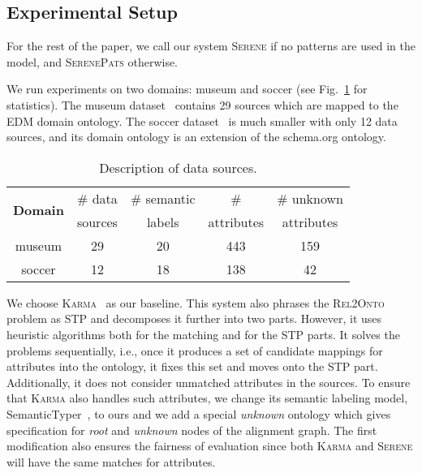 \documentclass[letterpaper]{article} %
\newcommand{\relonto}{\textsc{Rel2Onto}}
\newcommand{\karma}{\textsc{Karma}}
\newcommand{\serene}{\textsc{Serene}}
\newcommand{\serenepats}{\textsc{SerenePats}}
\begin{document}
\subsection{Experimental Setup}

For the rest of the paper, we call our system \serene{} if no patterns are used in the model, and \serenepats{} otherwise.

We run experiments on two domains: museum and soccer (see Fig.~\ref{tab:data} for statistics).
The museum dataset~\cite{taheriyan2016learning} contains 29 sources which are mapped to the EDM domain ontology.
The soccer dataset~\cite{Pham:semantic} is much smaller with only 12 data sources, and its domain ontology is an extension of the schema.org ontology.

\begin{table}[ht]\small
  \centering
  \caption{Description of data sources.}\label{tab:data}
		\begin{tabular}{ccccc}
		\hline
		\multirow{2}{*}{\textbf{Domain}} & \# data & \# semantic & \# & \# unknown\\
		 & sources & labels & attributes & attributes\\
		\hline
		museum & 29 & 20 & 443 & 159  \\
		soccer & 12 & 18 & 138 & 42 \\
		\hline
		\end{tabular} 
\end{table}


We choose \karma{}~\cite{taheriyan2016learning} as our baseline.
This system also phrases the \relonto{} problem as STP and decomposes it further into two parts.
However, it uses heuristic algorithms both for the matching and for the STP 
parts.
It solves the problems sequentially, i.e., once it produces a set of candidate 
mappings for attributes into the ontology, it fixes this set and moves
onto the STP part.
Additionally, it does not consider unmatched attributes in the sources.
To ensure that \karma{} also handles such attributes, we change its semantic 
labeling model, SemanticTyper~\cite{Ramnandan:Assigning}, to ours and we add a 
special \emph{unknown} ontology which gives specification for \emph{root} and 
\emph{unknown} nodes of the alignment graph.
The first modification also ensures the fairness of evaluation since both 
\karma{} and \serene{} will have the same matches for attributes.
\end{document}
